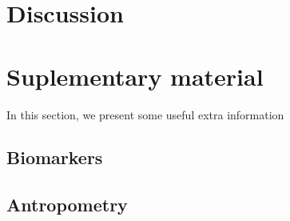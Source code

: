 \documentclass[10pt, a4paper, onecolumn]{article} %
\begin{document}
\section{Discussion}








 





\onecolumn

\section{Suplementary material}

In this section, we present some useful extra information\\

\subsection{Biomarkers}

	

	

\subsection{Antropometry}


\end{document}
